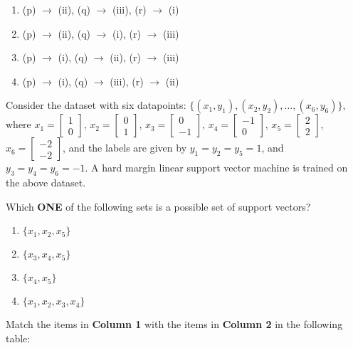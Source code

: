 \begin{enumerate}
    \item (p) $ \rightarrow $ (ii), (q) $ \rightarrow $ (iii), (r) $ \rightarrow $ (i)
    \item (p) $ \rightarrow $ (ii), (q) $ \rightarrow $ (i), (r) $ \rightarrow $ (iii)
    \item (p) $ \rightarrow $ (i), (q) $ \rightarrow $ (ii), (r) $ \rightarrow $ (iii)
    \item (p) $ \rightarrow $ (i), (q) $ \rightarrow $ (iii), (r) $ \rightarrow $ (ii)
\end{enumerate}

\item Consider the dataset with six datapoints: $ \{ (x_1, y_1), (x_2, y_2), \dots, (x_6, y_6) \} $,
where $ x_1 = \begin{bmatrix} 1 \\ 0 \end{bmatrix} $, $ x_2 = \begin{bmatrix} 0 \\ 1 \end{bmatrix} $, $ x_3 = \begin{bmatrix} 0 \\ -1 \end{bmatrix} $, $ x_4 = \begin{bmatrix} -1 \\ 0 \end{bmatrix} $, $ x_5 = \begin{bmatrix} 2 \\ 2 \end{bmatrix} $, $ x_6 = \begin{bmatrix} -2 \\ -2 \end{bmatrix} $,
and the labels are given by $ y_1 = y_2 = y_5 = 1 $, and $ y_3 = y_4 = y_6 = -1 $. A hard margin linear support vector machine is trained on the above dataset.

Which \textbf{ONE} of the following sets is a possible set of support vectors?

\begin{enumerate}
    \item $ \{ x_1, x_2, x_5 \} $
    \item $ \{ x_3, x_4, x_5 \} $
    \item $ \{ x_4, x_5 \} $
    \item $ \{ x_1, x_2, x_3, x_4 \} $
\end{enumerate}

\item Match the items in \textbf{Column 1} with the items in \textbf{Column 2} in the following table:

